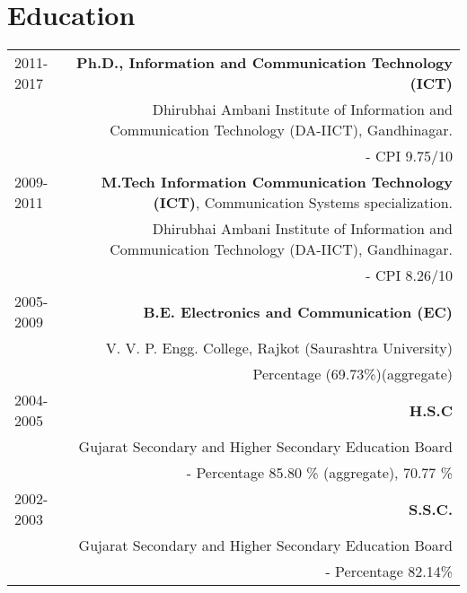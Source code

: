 \documentclass[10pt]{article}
\begin{document}
\section*{Education}
\begin{tabular}{L!{\VRule}R}
2011-2017& \textbf{Ph.D., Information and Communication Technology (ICT)}\\& Dhirubhai Ambani Institute of Information and Communication Technology (DA-IICT), Gandhinagar.\\&- CPI 9.75/10 \vspace{0.4cm}\\
2009-2011&\textbf{M.Tech Information Communication Technology (ICT)}, Communication Systems specialization. \\&Dhirubhai Ambani Institute of Information and Communication Technology (DA-IICT), Gandhinagar.\\&- CPI 8.26/10\vspace{0.4cm}\\
2005-2009&\textbf{B.E. Electronics and Communication (EC)}\\&V. V. P. Engg. College, Rajkot (Saurashtra University)\\& Percentage (69.73\%)(aggregate)\vspace{0.3cm}\\
2004-2005&\textbf{H.S.C}\\&Gujarat Secondary and Higher Secondary Education Board\\&- Percentage 85.80 \% (aggregate), 70.77 \%\vspace{0.4cm}\\
2002-2003&\textbf{S.S.C.}\\&Gujarat Secondary and Higher Secondary Education Board\\&- Percentage 82.14\% 
\end{tabular}
\vspace{0.25cm}


\end{document}

